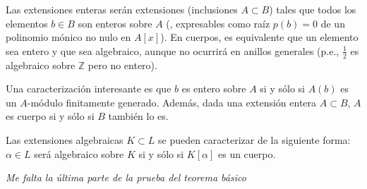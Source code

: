 Las extensiones enteras serán extensiones (inclusiones $A ⊂ B$) tales que todos los elementos $b ∈ B$ son enteros sobre $A$ (, expresables como raíz $p(b) = 0$ de un polinomio mónico no nulo en $A[x]$). En cuerpos, es equivalente que un elemento sea entero y que sea algebraico, aunque no ocurrirá en anillos generales (p.e., $\frac{1}{2}$ es algebraico sobre $ℤ$ pero no entero).

Una caracterización interesante es que $b$ es entero sobre $A$ si y sólo si $A(b)$ es un $A$-módulo finitamente generado. Además, dada una extensión entera $A ⊂ B$, $A$ es cuerpo si y sólo si $B$ también lo es.

Las extensiones algebraicas $K ⊂ L$ se pueden caracterizar de la siguiente forma: $α ∈ L$ será algebraico sobre $K$ si y sólo si $K[α]$ es un cuerpo.

\textit{Me falta la última parte de la prueba del teorema básico}

